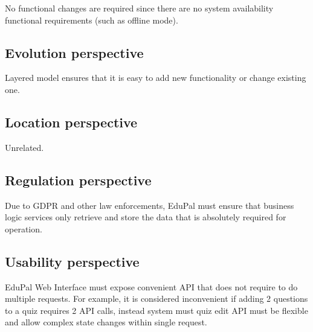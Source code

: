 No functional changes are required since there are no system availability functional requirements (such as offline mode).

\subsection{Evolution perspective}

Layered model ensures that it is easy to add new functionality or change existing one.

\subsection{Location perspective}

Unrelated.

\subsection{Regulation perspective}

Due to GDPR and other law enforcements, EduPal must ensure that business logic services only retrieve and store the data that is absolutely required for operation.

\subsection{Usability perspective}

EduPal Web Interface must expose convenient API that does not require to do multiple requests. For example, it is considered inconvenient if adding 2 questions to a quiz requires 2 API calls, instead system must quiz edit API must be flexible and allow complex state changes within single request.
